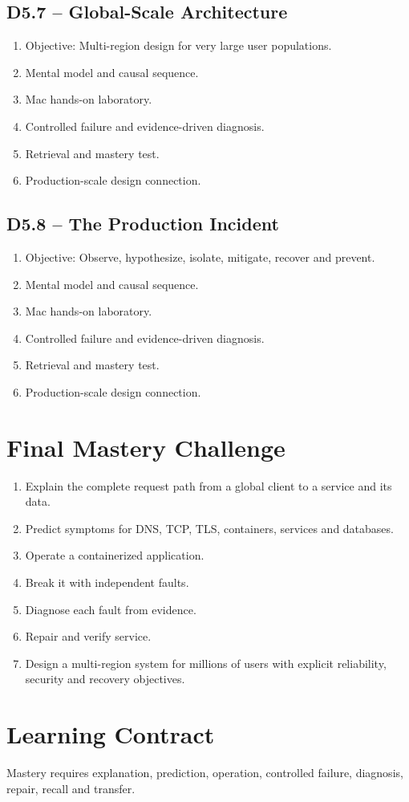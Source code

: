 \documentclass[11pt,a4paper]{book}
\begin{document}
\section{D5.7 -- Global-Scale Architecture}
\begin{enumerate}
\item Objective: Multi-region design for very large user populations.
\item Mental model and causal sequence.
\item Mac hands-on laboratory.
\item Controlled failure and evidence-driven diagnosis.
\item Retrieval and mastery test.
\item Production-scale design connection.
\end{enumerate}
\section{D5.8 -- The Production Incident}
\begin{enumerate}
\item Objective: Observe, hypothesize, isolate, mitigate, recover and prevent.
\item Mental model and causal sequence.
\item Mac hands-on laboratory.
\item Controlled failure and evidence-driven diagnosis.
\item Retrieval and mastery test.
\item Production-scale design connection.
\end{enumerate}
\chapter{Final Mastery Challenge}
\begin{enumerate}
\item Explain the complete request path from a global client to a service and its data.
\item Predict symptoms for DNS, TCP, TLS, containers, services and databases.
\item Operate a containerized application.
\item Break it with independent faults.
\item Diagnose each fault from evidence.
\item Repair and verify service.
\item Design a multi-region system for millions of users with explicit reliability, security and recovery objectives.
\end{enumerate}
\chapter*{Learning Contract}
Mastery requires explanation, prediction, operation, controlled failure, diagnosis, repair, recall and transfer.
\end{document}

